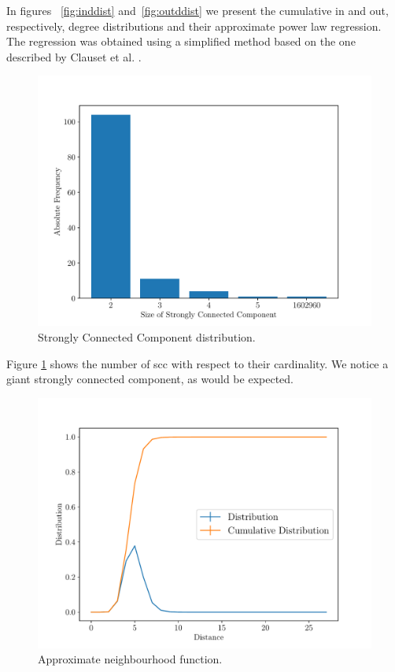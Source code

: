 \documentclass[9pt,a4paper,twocolumn]{article}
\begin{document}
In figures ~\ref{fig:inddist} and~\ref{fig:outddist} we present the cumulative in and out, respectively, degree distributions and their approximate power law regression. The regression was obtained using a simplified method based on the one described by Clauset et al. \cite{Clauset2009}.

\begin{figure}[h]
	\centering
	\includegraphics[width=\linewidth]{wikipedia_pt_sccdistr.pdf}
	\caption{Strongly Connected Component distribution.}
	\label{fig:sccdist}
\end{figure}

Figure \ref{fig:sccdist} shows the number of \acrshort{scc} with respect to their cardinality. We notice a giant strongly connected component, as would be expected.

\begin{figure}[h]
	\centering
	\includegraphics[width=\linewidth]{wikipedia_pt_neighbourhood_function.pdf}
	\caption{Approximate neighbourhood function.}
	\label{fig:neighfun}
\end{figure}
\end{document}
